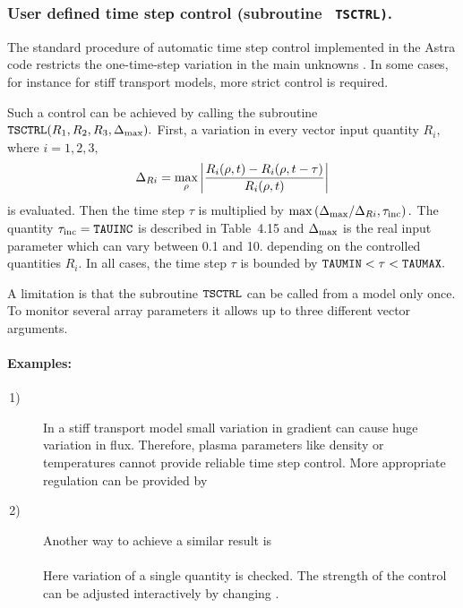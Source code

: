 \subsubsection{User defined time step control {\rm (subroutine \tt
TSCTRL)}.} 

The standard procedure of automatic time step control implemented in the
Astra code restricts the one-time-step variation in the main unknowns
.
In some cases, for instance for stiff transport models, more
strict control is required.
 
Such a control can be achieved by calling the subroutine 
${\tt TSCTRL}(R_1,R_2,R_3,\Delta_{\rm max}).$ 
First, a variation in every vector input quantity $R_i,$ where $i=1,2,3,$ 
$$
\Delta_{Ri}=\mathop{\rm max}\limits_\rho
\left|\frac{R_i(\rho,t)-R_i(\rho,t-\tau)}{R_i(\rho,t)}\right|
$$
is evaluated.
Then the time step $\tau$ is multiplied by 
$\max\left(\Delta_{\rm max}/\Delta_{Ri},\tau_{\rm inc}\right).$
The quantity $\tau_{\rm inc}=\tt TAUINC$ is described in Table~4.15
and $\Delta_{\rm max}$ is the real input parameter which can vary
between 0.1 and 10. depending on the controlled quantities $R_i.$
In all cases, the time step $\tau$ is bounded by 
${\tt TAUMIN}<\tau<\tt TAUMAX.$ 

A limitation is that the subroutine ${\tt TSCTRL}$ can be called from a
model only once. 
To monitor several array parameters it allows up to three different
vector arguments.

\paragraph{Examples:}
\begin{description}
\item[$\,$1)] In a stiff transport model small variation in gradient
can cause huge variation in flux.
Therefore, plasma parameters like density or temperatures cannot provide
reliable time step control.
More appropriate regulation can be provided by \\
\hspace*{2cm}
\item[$\,$2)] Another way to achieve a similar result is\\
\hspace*{2cm}\\
Here variation of a single quantity  is checked. 
The strength of the control can be adjusted interactively by changing
. 
\end{description}

